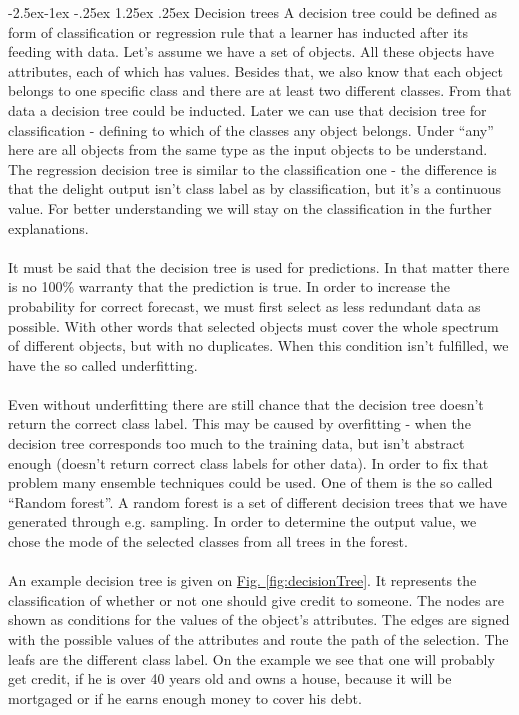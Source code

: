 \documentclass[runningheads,a4paper]{llncs}[2015/06/24]
\makeatletter
\renewcommand\paragraph{\@startsection{paragraph}{4}{\z@}%
            {-2.5ex\@plus -1ex \@minus -.25ex}%
            {1.25ex \@plus .25ex}%
            {\normalfont\normalsize\bfseries}}
\makeatother
\begin{document}
\paragraph{Decision trees}
 A decision tree could be defined as form of classification or regression rule that a learner has inducted after its feeding with data. Let's assume we have a set of objects. All these objects have attributes, each of which  has values. Besides that, we also know that each object belongs to one specific class and there are at least two different classes. From that data a decision tree could be inducted. Later we can use that decision tree for classification - defining to which of the classes any object belongs. Under \enquote{any} here are all objects from the same type as the input objects to be understand. The regression decision tree is similar to the classification one - the difference is that the delight output isn't class label as by classification, but it's a continuous value. For better understanding we will stay on the classification in the further explanations\cite{quinlan1986induction}.\\\\It must be said that the decision tree is used for predictions. In that matter there is no 100\% warranty that the prediction is true. In order to increase the probability for correct forecast, we must first select as less redundant data as possible. With other words that selected objects must cover the whole spectrum of different objects, but with no duplicates. When this condition isn't fulfilled, we have the so called underfitting\cite{quinlan1986induction}.\\\\
Even without underfitting there are still chance that the decision tree doesn't return the correct class label. This may be caused by overfitting - when the decision tree corresponds too much to the training data, but isn't abstract enough (doesn't return correct class labels for other data). In order to fix that problem many ensemble techniques could be used. One of them is the so called \enquote{Random forest}. A random forest is a set of different decision trees that we have generated through e.g. sampling. In order to determine the output value, we chose the mode of the selected classes from all trees in the forest\cite{breiman2001random}.\\\\
An example decision tree is given on \hyperref[fig:decisionTree]{Fig. \ref{fig:decisionTree}}. It represents the classification of whether or not one should give credit to someone. The nodes are shown as conditions for the values of the object's attributes. The edges are signed with the possible values of the attributes and route the path of the selection. The leafs are the different class label. On the example we see that one will probably get credit, if he is over 40 years old and owns a house, because it will be mortgaged or if he earns enough money to cover his debt.   
    
\end{document}
